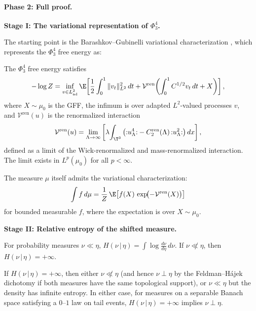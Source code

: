 \paragraph{Phase 2: Full proof.}

\bigskip
\noindent\textbf{Stage I: The variational representation of $\Phi^4_3$.}

The starting point is the Barashkov--Gubinelli variational characterization
\cite{BG20}, which represents the $\Phi^4_3$ free energy as:

\begin{theorem}\label{thm:BG-variational}
The $\Phi^4_3$ free energy satisfies
\begin{equation}\label{eq:BG-var}
  -\log Z = \inf_{v \in L^2_{\mathrm{ad}}} \E\!\left[
    \frac{1}{2}\int_0^1 \|v_t\|_{L^2}^2\,dt
    + \mathcal{V}^{\mathrm{ren}}\!\left(\int_0^1 C^{1/2}v_t\,dt + X\right)
  \right],
\end{equation}
where $X \sim \mu_0$ is the GFF, the infimum is over adapted $L^2$-valued
processes $v$, and $\mathcal{V}^{\mathrm{ren}}(u)$ is the renormalized
interaction
\[
  \mathcal{V}^{\mathrm{ren}}(u)
  = \lim_{\Lambda \to \infty}\left[
    \lambda\!\int_{\T^3}\left({:}u_\Lambda^4{:}
    - C_2^{\mathrm{ren}}(\Lambda)\,{:}u_\Lambda^2{:}\right)dx
  \right],
\]
defined as a limit of the Wick-renormalized and mass-renormalized interaction.
The limit exists in $L^p(\mu_0)$ for all $p < \infty$.
\end{theorem}

The measure $\mu$ itself admits the variational characterization:
\begin{equation}\label{eq:mu-variational}
  \int f\,d\mu = \frac{1}{Z}\,\E\!\left[
    f(X)\,\exp\!\bigl(-\mathcal{V}^{\mathrm{ren}}(X)\bigr)
  \right]
\end{equation}
for bounded measurable $f$, where the expectation is over $X \sim \mu_0$.

\bigskip
\noindent\textbf{Stage II: Relative entropy of the shifted measure.}

\begin{definition}\label{def:rel-entropy}
For probability measures $\nu \ll \eta$,
$H(\nu \,|\, \eta) = \int \log\frac{d\nu}{d\eta}\,d\nu$.
If $\nu \not\ll \eta$, then $H(\nu \,|\, \eta) = +\infty$.
\end{definition}

\begin{lemma}\label{lem:pinsker-singular}
If $H(\nu \,|\, \eta) = +\infty$, then either $\nu \not\ll \eta$ (and hence
$\nu \perp \eta$ by the Feldman--H\'ajek dichotomy if both measures have the
same topological support), or $\nu \ll \eta$ but the density has infinite entropy.
In either case, for measures on a separable Banach space satisfying a $0$--$1$
law on tail events, $H(\nu\,|\,\eta) = +\infty$ implies $\nu \perp \eta$.
\end{lemma}

